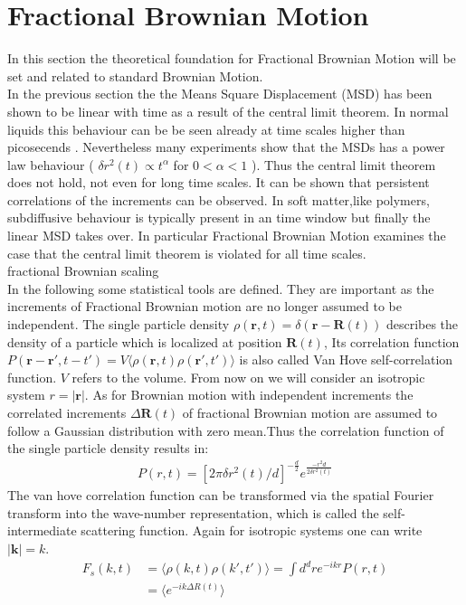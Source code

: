 \documentclass[
  a4paper,BCOR10mm,oneside,
  bibtotoc,idxtotoc,
  headsepline,footsepline,%
  fleqn,openbib
]{scrbook}
\begin{document}
\section{Fractional Brownian Motion}
In this section the theoretical foundation for Fractional Brownian Motion will be set and related to standard Brownian Motion. \\
In the previous section the the Means Square Displacement (MSD) has been shown to be linear with time as a result of the central limit theorem. In normal liquids this behaviour can be be seen already at time scales higher than picosecends \cite{Hofling2013}. Nevertheless many experiments show that the MSDs has a power law behaviour ( $\delta r ^2 (t) \propto t^{\alpha}$ for  $0 < \alpha < 1$ ). Thus the central limit theorem does not hold, not even for long time scales. It can be shown that persistent correlations of the increments can be observed. In soft matter,like polymers, subdiffusive behaviour is typically present in an time window but finally the linear MSD takes over. In particular Fractional Brownian Motion examines the case that the central limit theorem is violated for all time scales.\\
fractional Brownian scaling\\
In the following some statistical tools are defined. They are important as the increments of Fractional Brownian motion are no longer assumed to be independent. The single particle density $\rho(\bm{r},t)=\delta(\bm{r}-\bm{R}(t))$ describes the density of a particle which is localized at position $\bm{R}(t)$, Its correlation function $P(\bm{r}-\bm{r}',t-t')= V\langle\rho(\bm{r},t) \rho(\bm{r}',t')\rangle$ is also called Van Hove self-correlation function. $V$ refers to the volume. From now on we will consider an isotropic system $ r= |\bm{r}|$. As for Brownian motion with independent increments the correlated increments  $\Delta\bm{R}(t)$ of fractional Brownian motion are assumed to follow a Gaussian distribution with zero mean.Thus the correlation function of the single particle density results in:
\begin{align}
 P(r,t)=[2 \pi \delta r^{2}(t)/d]^{-\frac{d}{2}} e^{ \frac{-r^2 d}{2 \delta r^{2}(t) }}
\end{align}
The van hove correlation function can be transformed via the spatial Fourier transform into the wave-number representation, which is called the self-intermediate scattering function. Again for isotropic systems one can write $|\bm{k}|=k$.
\begin{align}
 F_{s}(k,t)&=\langle\rho(k,t) \rho(k',t')\rangle=\int d^{d}r e^{-i k r} P(r,t) \\
 &=\langle e^{-i k \Delta R(t)} \rangle
\end{align}
\end{document}
